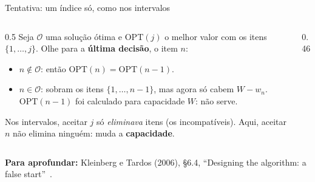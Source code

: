 \documentclass[aspectratio=169,xcolor=table]{beamer}
\newcommand{\fonte}[1]{%
  \vfill
  {\tiny\color{gray!55!black}\textbf{Para aprofundar:} #1\par}%
}
\begin{document}
\begin{frame}{Tentativa: um índice só, como nos intervalos}
  \begin{columns}[c]
    \begin{column}{0.5\textwidth}
      \scriptsize Seja $\mathcal{O}$ uma solução ótima e $\mathrm{OPT}(j)$ o melhor valor com
      os itens $\{1,\dots,j\}$. Olhe para a \textbf{última decisão}, o item $n$:
      \begin{itemize}\scriptsize
        \item $n \notin \mathcal{O}$: então $\mathrm{OPT}(n) = \mathrm{OPT}(n-1)$. \checkmark
        \item $n \in \mathcal{O}$: sobram os itens $\{1,\dots,n-1\}$, mas agora só cabem
              \alert{$W - w_n$}. $\mathrm{OPT}(n-1)$ foi calculado para capacidade $W$:
              não serve.
      \end{itemize}
      Nos intervalos, aceitar $j$ só \emph{eliminava} itens (os incompatíveis). Aqui, aceitar
      $n$ não elimina ninguém: muda a \textbf{capacidade}.
    \end{column}
    \begin{column}{0.46\textwidth}
      \centering
    \end{column}
  \end{columns}
  \fonte{Kleinberg e Tardos (2006), \S 6.4, ``Designing the algorithm: a false
    start''~\cite{kleinberg2006algorithm}.}
\end{frame}
\end{document}
